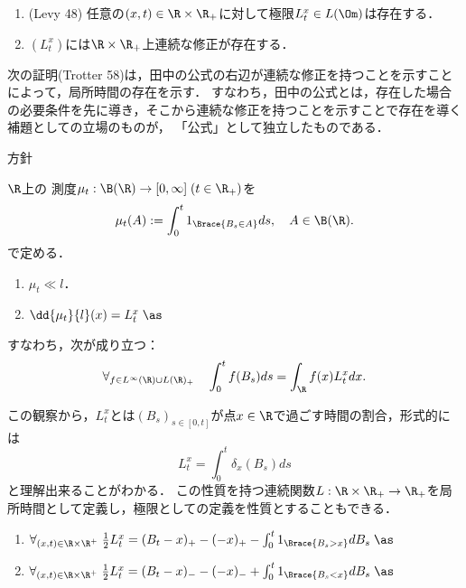 \documentclass[uplatex,dvipdfmx]{jsreport}
\begin{document}
\begin{lemma}\mbox{}
    \begin{enumerate}
        \item (Levy 48) 任意の$(x,t)\in\R\times\R_+$に対して極限$L^x_t\in L(\Om)$は存在する．
        \item $(L_t^x)$には$\R\times\R_+$上連続な修正が存在する．
    \end{enumerate}
\end{lemma}
\begin{remarks}
    次の証明(Trotter 58)は，田中の公式の右辺が連続な修正を持つことを示すことによって，局所時間の存在を示す．
    すなわち，田中の公式とは，存在した場合の必要条件を先に導き，そこから連続な修正を持つことを示すことで存在を導く補題としての立場のものが，
    「公式」として独立したものである．
\end{remarks}
\begin{Proof}\mbox{}
    \begin{description}
        \item[方針] 
    \end{description}
\end{Proof}

\begin{proposition}[局所時間の性質]
    $\R$上の
    測度$\mu_t:\B(\R)\to[0,\infty]\;(t\in\R_+)$を
    \[\mu_t(A):=\int^t_01_{\Brace{B_s\in A}}ds,\quad A\in\B(\R).\]
    で定める．
    \begin{enumerate}
        \item $\mu_t\ll l$．
        \item $\dd{\mu_t}{l}(x)=L^x_t\;\as$
    \end{enumerate}
    すなわち，次が成り立つ：
    \[\forall_{f\in L^\infty(\R)\cup L(\R)_+}\quad\int^t_0f(B_s)ds=\int_\R f(x)L^x_tdx.\]
\end{proposition}
\begin{remarks}
    この観察から，$L^x_t$とは$(B_s)_{s\in[0,t]}$が点$x\in\R$で過ごす時間の割合，形式的には
    \[L^x_t=\int^t_0\delta_x(B_s)ds\]
    と理解出来ることがわかる．
    この性質を持つ連続関数$L:\R\times\R_+\to\R_+$を局所時間として定義し，極限としての定義を性質とすることもできる．
\end{remarks}

\begin{theorem}[Tanaka (63)]\mbox{}
    \begin{enumerate}
        \item $\forall_{(x,t)\in\R\times\R^+}\;\frac{1}{2}L^x_t=(B_t-x)_+-(-x)_+-\int^t_01_{\Brace{B_s>x}}dB_s\;\as$
        \item $\forall_{(x,t)\in\R\times\R^+}\;\frac{1}{2}L^x_t=(B_t-x)_--(-x)_-+\int^t_01_{\Brace{B_s<x}}dB_s\;\as$
    \end{enumerate}
\end{theorem}
\end{document}
